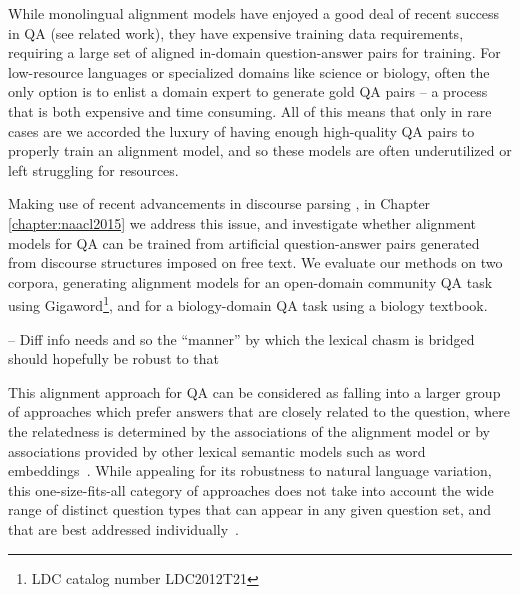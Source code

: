 While monolingual alignment models have enjoyed a good deal of recent success in QA (see related work), they have expensive training data requirements,  
requiring a large set of aligned in-domain question-answer pairs for training.
For low-resource languages or specialized domains like science or biology, often the only option is to enlist a domain expert to generate gold QA pairs --  a process that is both expensive and time consuming.  All of this means that only in rare cases are we accorded the luxury of having enough high-quality QA pairs to properly train an alignment model, and so these models are often underutilized or left struggling for resources. 

Making use of recent advancements in discourse parsing \cite{feng12}, in Chapter \ref{chapter:naacl2015} we address this issue, and investigate whether alignment models for QA can be trained from artificial question-answer pairs generated from discourse structures imposed on free text. 
We evaluate our methods on two corpora, generating alignment models for an open-domain community QA task using Gigaword\footnote{LDC catalog number LDC2012T21}, and for a biology-domain QA task using a biology textbook. 


-- Diff info needs and so the “manner” by which the lexical chasm is bridged should hopefully be robust to that

This alignment approach for QA can be considered as falling into a larger group of approaches which prefer answers that are closely related to the question, where the relatedness is determined by the associations of the alignment model or by associations provided by other lexical semantic models such as word embeddings~\cite{yih13,jansen14,fried2015higher}. 
While appealing for its robustness to natural language variation, this one-size-fits-all category of approaches does not take into account the wide range of distinct question types that can appear in any given question set, and that are best addressed individually~\cite{chu2004ibm,ferrucci2010building,clark2013study}.  

